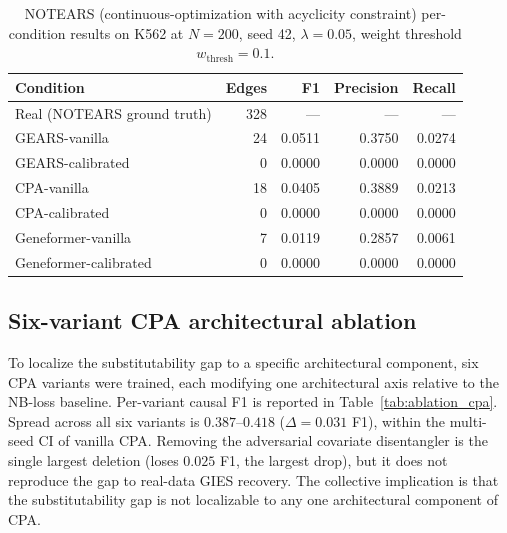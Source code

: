 \documentclass{article}
\theoremstyle{plain}
\theoremstyle{definition}
\theoremstyle{remark}
\begin{document}
\begin{table}[h]
\centering
\small
\begin{tabular}{lrrrr}
\toprule
\textbf{Condition} & \textbf{Edges} & \textbf{F1} & \textbf{Precision} & \textbf{Recall} \\
\midrule
Real (NOTEARS ground truth) & 328 & --- & --- & --- \\
GEARS-vanilla            & 24  & 0.0511 & 0.3750 & 0.0274 \\
GEARS-calibrated         & 0   & 0.0000 & 0.0000 & 0.0000 \\
CPA-vanilla              & 18  & 0.0405 & 0.3889 & 0.0213 \\
CPA-calibrated           & 0   & 0.0000 & 0.0000 & 0.0000 \\
Geneformer-vanilla       & 7   & 0.0119 & 0.2857 & 0.0061 \\
Geneformer-calibrated    & 0   & 0.0000 & 0.0000 & 0.0000 \\
\bottomrule
\end{tabular}
\caption{NOTEARS (continuous-optimization with acyclicity constraint) per-condition results on K562 at $N{=}200$, seed 42, $\lambda{=}0.05$, weight threshold $w_{\mathrm{thresh}}{=}0.1$.}
\label{tab:notears_full}
\end{table}

\subsection{Six-variant CPA architectural ablation}
\label{app:cpa_ablation}

To localize the substitutability gap to a specific architectural component, six CPA variants were trained, each modifying one architectural axis relative to the NB-loss baseline. Per-variant causal F1 is reported in Table~\ref{tab:ablation_cpa}. Spread across all six variants is $0.387$--$0.418$ ($\Delta = 0.031$ F1), within the multi-seed CI of vanilla CPA. Removing the adversarial covariate disentangler is the single largest deletion (loses $0.025$ F1, the largest drop), but it does not reproduce the gap to real-data GIES recovery. The collective implication is that the substitutability gap is not localizable to any one architectural component of CPA.
\end{document}
